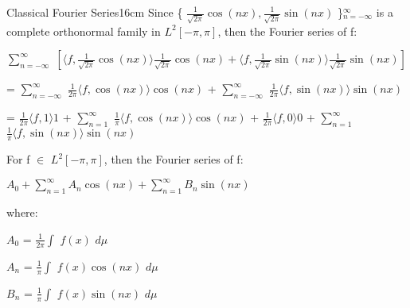     \vspace{0.5cm}



    \begin{definition}{Classical Fourier Series}{16cm}
        Since \{ $\frac{1}{\sqrt{2\pi}} \cos(nx)
                    , \frac{1}{\sqrt{2\pi}} \sin(nx)$ \}$_{n=-\infty}^{\infty}$
        is a complete orthonormal family in $L^2[-\pi,\pi]$, then
        the Fourier series of f:

        \hspace{0.5cm}
        $\sum_{n=-\infty}^{\infty}$
            $[\langle f , \frac{1}{\sqrt{2\pi}}\cos(nx) \rangle
                \frac{1}{\sqrt{2\pi}}\cos(nx)
                + \langle f , \frac{1}{\sqrt{2\pi}}\sin(nx) \rangle
                    \frac{1}{\sqrt{2\pi}}\sin(nx)]$

        \hspace{0.5cm}
        = $\sum_{n=-\infty}^{\infty}$
            $\frac{1}{2\pi} \langle f , \cos(nx) \rangle \cos(nx)$
            + $\sum_{n=-\infty}^{\infty}$
                $\frac{1}{2\pi} \langle f , \sin(nx) \rangle \sin(nx)$

        \hspace{0.5cm}
        = $\frac{1}{2\pi} \langle f , 1 \rangle 1$
            + $\sum_{n=1}^{\infty}$
                $\frac{1}{\pi} \langle f , \cos(nx) \rangle \cos(nx)$
            + $\frac{1}{2\pi} \langle f ,  0 \rangle 0$
            + $\sum_{n=1}^{\infty}$
                $\frac{1}{\pi} \langle f , \sin(nx) \rangle \sin(nx)$

        \vspace{0.3cm}

        For f $\in$ $L^2[-\pi,\pi]$, then the Fourier series of f:

        \hspace{0.5cm}
        $A_0 + \sum_{n=1}^{\infty} A_n \cos(nx) + \sum_{n=1}^{\infty} B_n \sin(nx)$

        where:

        \hspace{0.5cm}
        $A_0$ = $\frac{1}{2\pi} \int$ $f(x)$ $d\mu$

        \hspace{0.5cm}
        $A_n$ = $\frac{1}{\pi} \int$ $f(x) \cos(nx)$ $d\mu$

        \hspace{0.5cm}
        $B_n$ = $\frac{1}{\pi} \int$ $f(x) \sin(nx)$ $d\mu$
    \end{definition}





































